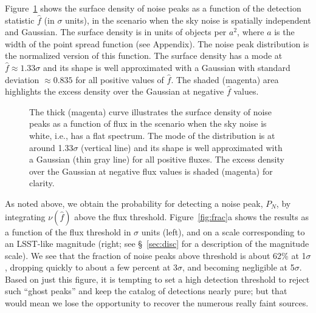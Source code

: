 \documentclass[twocolumn]{emulateapj}
\newcommand{\flux}{f}
\newcommand{\fest}{\hat{\flux}}  %
\newcommand{\npd}{\nu}  %
\begin{document}
Figure~\ref{fig:surface} shows the surface density of noise peaks as a function of the detection statistic $\fest$ (in $\sigma$ units), in the scenario when the sky noise is spatially independent and Gaussian.
The surface density is in units of objects per $a^2$, where $a$ is the width of the point spread function (see Appendix).
The noise peak distribution is the normalized version of this function.
The surface density has a mode at $\fest \approx 1.33\sigma$ and its shape is well approximated with a Gaussian with standard deviation $\approx 0.835$ for all positive values of $\fest$. 
The shaded (magenta) area highlights the excess density over the Gaussian at negative $\fest$ values.

\begin{figure}
\caption{The thick (magenta) curve illustrates the surface density of noise peaks as a function of flux in the scenario when the sky noise is white, i.e., has a flat spectrum. The mode of the distribution is at around 1.33$\sigma$ (vertical line) and its shape is well approximated with a Gaussian (thin gray line) for all positive fluxes. The excess density over the Gaussian at negative flux values is shaded (magenta) for clarity.}
\label{fig:surface}
\end{figure}

As noted above, we obtain the probability for detecting a noise peak, $P_N$, by integrating $\npd(\fest)$ above the flux threshold.
%
Figure~\ref{fig:frac}a shows the results as a function of the flux threshold in $\sigma$ units (left), and on a scale corresponding to an LSST-like magnitude (right; see \S~\ref{sec:disc} for a description of the magnitude scale).
We see that the fraction of noise peaks above threshold is about 62\% at 1$\sigma$, dropping quickly to about a few percent at 3$\sigma$, and becoming negligible at 5$\sigma$.
%
Based on just this figure, it is tempting to set a high detection threshold to reject such ``ghost peaks'' and keep the catalog of detections nearly pure; but that would mean we lose the opportunity to recover the numerous really faint sources. 

\begin{figure*}
\caption{The fraction of detected noise peaks drops quickly by raising the threshold. At 1$\sigma$ the value is about 62\% but at 3$\sigma$ it is only a few percent and at 5$\sigma$, which is 24 magnitudes in this case, the detected fraction is negligible. Naively this makes it highly desirable to put a harder constraint on the detection limit but then the opportunity is lost to track fainter sources. The right solution is not this shortcut.}
\label{fig:frac}
\end{figure*}
\end{document}

